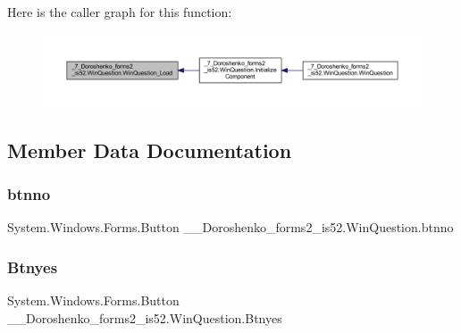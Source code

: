 Here is the caller graph for this function\+:
\nopagebreak
\begin{figure}[H]
\begin{center}
\leavevmode
\includegraphics[width=350pt]{class__7___doroshenko__forms2__is52_1_1_win_question_a5d411864ac52b7998aba29e9adb8f902_icgraph}
\end{center}
\end{figure}


\subsection{Member Data Documentation}
\hypertarget{class__7___doroshenko__forms2__is52_1_1_win_question_ae5d5b9cd03491cb98cb1ed10aab2469b}{}\label{class__7___doroshenko__forms2__is52_1_1_win_question_ae5d5b9cd03491cb98cb1ed10aab2469b} 
\subsubsection{\texorpdfstring{btnno}{btnno}}
{\footnotesize\ttfamily System.\+Windows.\+Forms.\+Button \+\_\+\_\+\+Doroshenko\+\_\+forms2\+\_\+is52.\+Win\+Question.\+btnno\hspace{0.3cm}{\ttfamily [private]}}

\hypertarget{class__7___doroshenko__forms2__is52_1_1_win_question_ac516c18821f9ff0a33bb10d41b51db4e}{}\label{class__7___doroshenko__forms2__is52_1_1_win_question_ac516c18821f9ff0a33bb10d41b51db4e} 
\subsubsection{\texorpdfstring{Btnyes}{Btnyes}}
{\footnotesize\ttfamily System.\+Windows.\+Forms.\+Button \+\_\+\_\+\+Doroshenko\+\_\+forms2\+\_\+is52.\+Win\+Question.\+Btnyes\hspace{0.3cm}{\ttfamily [private]}}


